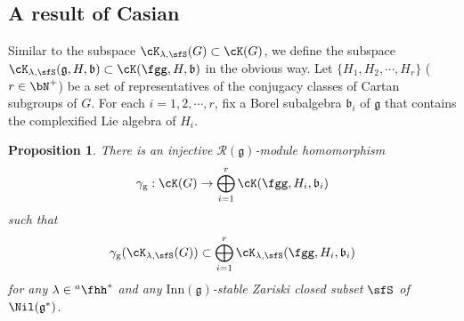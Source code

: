 \documentclass[12pt,a4paper]{amsart}
\newcommand{\g}{\mathfrak g}
\renewcommand{\b}{\mathfrak b}
\newcommand{\be}{\begin {equation}}
\newcommand{\ee}{\end {equation}}
\numberwithin{equation}{section}
\newtheorem{prop}[thm]{Proposition}
\theoremstyle{remark}
\def\hha{{}^a\fhh}
\def\Inn{\mathrm{Inn}}
\newcommand{\Grt}{\cK}
\begin{document}
\subsection{A result of Casian}

 Similar to the subspace $\Grt_{\lambda, \sfS}(G)\subset \Grt(G)$, we define the subspace $\Grt_{\lambda, \sfS}(\g,H,\b)\subset \Grt(\fgg,H,\b)$ in the obvious way.
Let $\{H_1, H_2, \cdots, H_r\}$ ($r\in \bN^+$) be  a set of representatives of the
conjugacy classes of Cartan subgroups of $G$. For each $i=1,2,\cdots, r$, fix a Borel subalgebra $\b_i$ of $\g$ that contains the complexified Lie algebra of $H_i$.

 \begin{prop}\label{cor:HC.embed}
 There is an injective $\mathcal R(\g)$-module homomorphism
 \[
\gamma_{\mathrm g}: \Grt(G)\rightarrow  \bigoplus_{i=1}^{r} \Grt(\fgg,H_{i},\b_{i})
 \]
 such that
 \be\label{gammag}
   \gamma_{\mathrm g}(\Grt_{\lambda, \sfS}(G))\subset  \bigoplus_{i=1}^{r} \Grt_{\lambda, \sfS}(\fgg,H_{i},\b_{i})
 \ee
 for any $\lambda\in \hha^*$ and any $\Inn(\g)$-stable Zariski closed subset $\sfS$ of $\Nil(\g^*)$.

 \end{prop}
\end{document}
